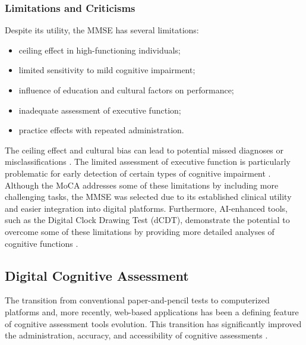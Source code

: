 \subsubsection{Limitations and Criticisms}
Despite its utility, the MMSE has several limitations:
\begin{itemize}
\item ceiling effect in high-functioning individuals;
\item limited sensitivity to mild cognitive impairment;
\item influence of education and cultural factors on performance;
\item inadequate assessment of executive function;
\item practice effects with repeated administration.
\end{itemize}
The ceiling effect and cultural bias can lead to potential missed diagnoses or misclassifications \cite{FrancoMarina2010, Kim2010}. The limited assessment of executive function is particularly problematic for early detection of certain types of cognitive impairment \cite{Diamond2013}. Although the MoCA addresses some of these limitations by including more challenging tasks, the MMSE was selected due to its established clinical utility and easier integration into digital platforms. Furthermore, AI-enhanced tools, such as the Digital Clock Drawing Test (dCDT), demonstrate the potential to overcome some of these limitations by providing more detailed analyses of cognitive functions \cite{Jiménez-Mesa2023}.

\subsection{Digital Cognitive Assessment}
The transition from conventional paper-and-pencil tests to computerized platforms and, more recently, web-based applications has been a defining feature of cognitive assessment tools evolution. This transition has significantly improved the administration, accuracy, and accessibility of cognitive assessments \cite{Bauer2012, Zygouris2017}.

